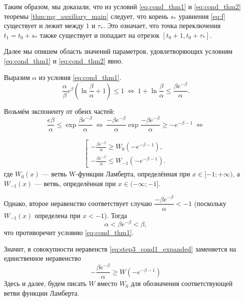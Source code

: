Таким образом, мы доказали, что из условий \eqref{eq:cond_thm1} и \eqref{eq:cond_thm2} теоремы \ref{thm:mg_auxiliary_main} следует, что корень $s_*$ уравнения \eqref{eq:f} существует и лежит между $1$ и $\tau_*$. Это означает, что точка переключения $t_1 = t_0 + s_*$ также существует и попадает на отрезок $[t_0 + 1, t_0 + \tau_*]$.

Далее мы опишем область значений параметров, удовлетворяющих условиям \eqref{eq:cond_thm1} и \eqref{eq:cond_thm2} явно.

Выразим $\alpha$ из условия \eqref{eq:cond_thm1}.
\begin{equation*}
\frac{\alpha}{\beta}e^{\beta}\left(\ln\frac{\beta}{\alpha} + 1\right) \leqslant 1\ \Leftrightarrow\ 1 + \ln\dfrac{\beta}{\alpha} \leqslant \dfrac{\beta e^{-\beta}}{\alpha}.
\end{equation*}

Возьмём экспоненту от обеих частей:
\begin{equation*}
\dfrac{e\beta}{\alpha} \leqslant \exp\dfrac{\beta e^{-\beta}}{\alpha}\ \Leftrightarrow\ \dfrac{-\beta e^{-\beta}}{\alpha}\exp \dfrac{-\beta e^{-\beta}}{\alpha} \geqslant -e^{-\beta - 1}\ \Leftrightarrow
\end{equation*}

\begin{align}
\label{eq:step3_cond1_expanded}
\left[
\begin{array}{ll}
	-\frac{\beta e^{-\beta}}{\alpha} \geqslant W_0(-e^{-\beta - 1}),\\
	-\frac{\beta e^{-\beta}}{\alpha} \leqslant W_{-1}(-e^{-\beta - 1}).
\end{array}
\right.
\end{align}
%
где $W_0(x)$ --- ветвь W-функции Ламберта, определённая при $x \in [-1; +\infty)$, а $W_{-1}(x)$ --- ветвь, определённая при $x \in (-\infty; -1]$.

Однако, второе неравенство соответствует случаю $\dfrac{-\beta e^{-\beta}}{\alpha} < -1$ (поскольку $W_{-1}(x)$ определена при $x < -1$). Тогда
\begin{equation*}
\alpha < \beta e^{-\beta} < \beta,
\end{equation*}
что противоречит условию \eqref{eq:cond_thm1}.

Значит, в совокупности неравенств \eqref{eq:step3_cond1_expanded} заменяется на единственное неравенство
\begin{equation}
\label{eq:step3_cond1}
-\frac{\beta e^{-\beta}}{\alpha} \geqslant W(-e^{-\beta - 1})
\end{equation}
Здесь и далее, будем писать $W$ вместо $W_0$ для обозначения соответствующей ветви функции Ламберта.

